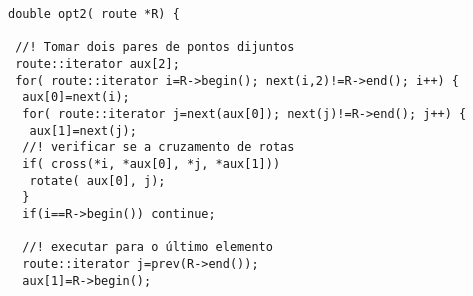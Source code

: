 \documentclass[a4paper, 12pt]{article}
\begin{document}
{\small 
\begin{verbatim}
double opt2( route *R) {                                                                                                                                        
                                                                                                                                                                
 //! Tomar dois pares de pontos dijuntos                                                                                                                        
 route::iterator aux[2];                                                                                                                                        
 for( route::iterator i=R->begin(); next(i,2)!=R->end(); i++) {                                                                                                 
  aux[0]=next(i);                                                                                                                                               
  for( route::iterator j=next(aux[0]); next(j)!=R->end(); j++) {                                                                                                
   aux[1]=next(j);                                                                                                                                              
  //! verificar se a cruzamento de rotas                                                                                                                        
  if( cross(*i, *aux[0], *j, *aux[1]))                                                                                                                          
   rotate( aux[0], j);                                                                                                                                          
  }                                                                                                                                                             
  if(i==R->begin()) continue;                                                                                                                                   
                                                                                                                                                                
  //! executar para o último elemento                                                                                                                           
  route::iterator j=prev(R->end());                                                                                                                             
  aux[1]=R->begin();                                                                                                                                            
                                                                                                                                                                

\end{verbatim}}
\end{document}
